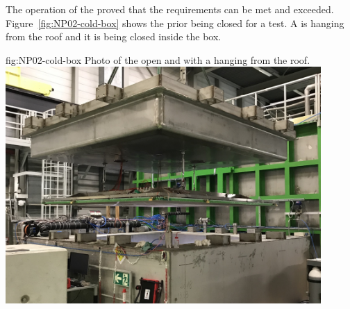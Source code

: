 The operation of the   \coldbox proved that the requirements can be met and exceeded.
Figure~\ref{fig:NP02-cold-box} shows the   \coldbox prior being closed for a test.
A  is hanging from the roof and it is being closed inside the box.
\begin{dunefigure}{fig:NP02-cold-box}
{Photo of the  \coldbox open and with a  hanging from the roof.}
\includegraphics[width=0.9\textwidth]{graphics/NP02-cold-box.jpg}
\end{dunefigure}

